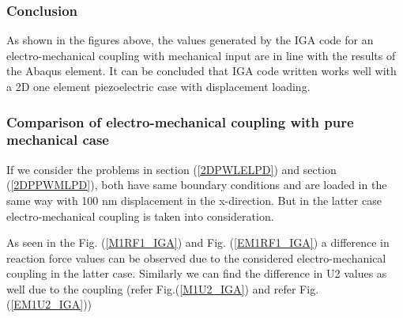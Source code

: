 \documentclass[11pt]{article}
\begin{document}
\subsubsection{Conclusion}
As shown in the figures above, the values generated by the IGA code for an electro-mechanical coupling with mechanical input are in line with the results of the Abaqus element. It can be concluded that IGA code written works well with a 2D one element piezoelectric case with displacement loading.

\subsubsection{Comparison of electro-mechanical coupling with pure mechanical case}
If we consider the problems in section (\ref{2DPWLELPD}) and section (\ref{2DPPWMLPD}), both have same boundary conditions and are loaded in the same way with 100 nm displacement in the x-direction. But in the latter case electro-mechanical coupling is taken into consideration.

As seen in the Fig. (\ref{M1RF1_IGA}) and Fig. (\ref{EM1RF1_IGA}) a difference in reaction force values can be observed due to the considered electro-mechanical coupling in the latter case. Similarly we can find the difference in U2 values as well due to the coupling (refer Fig.(\ref{M1U2_IGA}) and refer Fig. (\ref{EM1U2_IGA}))
\end{document}
